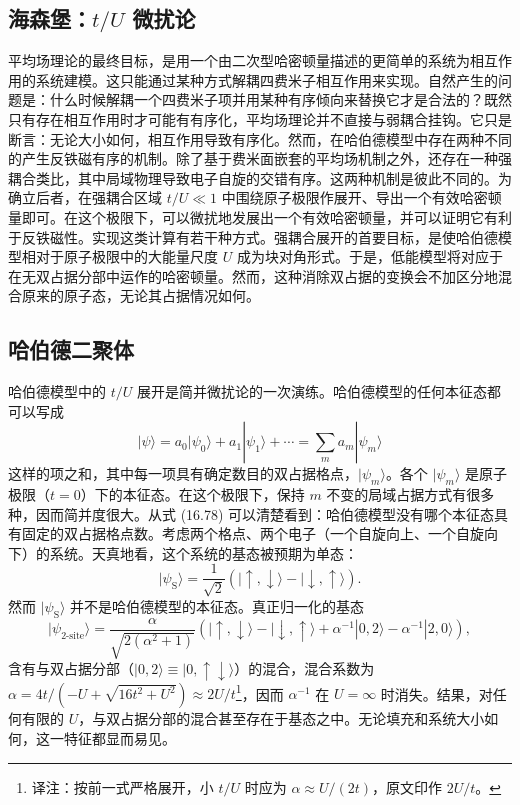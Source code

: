 \subsection{海森堡：$t/U$ 微扰论}

平均场理论的最终目标，是用一个由二次型哈密顿量描述的更简单的系统为相互作用的系统建模。这只能通过某种方式解耦四费米子相互作用来实现。自然产生的问题是：什么时候解耦一个四费米子项并用某种有序倾向来替换它才是合法的？既然只有存在相互作用时才可能有有序化，平均场理论并不直接与弱耦合挂钩。它只是断言：无论大小如何，相互作用导致有序化。然而，在哈伯德模型中存在两种不同的产生反铁磁有序的机制。除了基于费米面嵌套的平均场机制之外，还存在一种强耦合类比，其中局域物理导致电子自旋的交错有序。这两种机制是彼此不同的。为确立后者，在强耦合区域 $t/U\ll 1$ 中围绕原子极限作展开、导出一个有效哈密顿量即可。在这个极限下，可以微扰地发展出一个有效哈密顿量，并可以证明它有利于反铁磁性。实现这类计算有若干种方式。强耦合展开的首要目标，是使哈伯德模型相对于原子极限中的大能量尺度 $U$ 成为块对角形式。于是，低能模型将对应于在无双占据分部中运作的哈密顿量。然而，这种消除双占据的变换会不加区分地混合原来的原子态，无论其占据情况如何。

\subsection*{哈伯德二聚体}

哈伯德模型中的 $t/U$ 展开是简并微扰论的一次演练。哈伯德模型的任何本征态都可以写成
\begin{equation*}
|\psi\rangle=a_{0}|\psi_{0}\rangle+a_{1}|\psi_{1}\rangle+\cdots=\sum_{m}a_{m}|\psi_{m}\rangle\tag{16.78}
\end{equation*}
这样的项之和，其中每一项具有确定数目的双占据格点，$|\psi_{m}\rangle$。各个 $|\psi_{m}\rangle$ 是原子极限（$t=0$）下的本征态。在这个极限下，保持 $m$ 不变的局域占据方式有很多种，因而简并度很大。从式 (16.78) 可以清楚看到：哈伯德模型没有哪个本征态具有固定的双占据格点数。考虑两个格点、两个电子（一个自旋向上、一个自旋向下）的系统。天真地看，这个系统的基态被预期为单态：
\begin{equation*}
|\psi_{\mathrm{S}}\rangle=\frac{1}{\sqrt{2}}\left(|\uparrow,\downarrow\rangle-|\downarrow,\uparrow\rangle\right).\tag{16.79}
\end{equation*}
然而 $|\psi_{\mathrm{S}}\rangle$ 并不是哈伯德模型的本征态。真正归一化的基态
\begin{equation*}
|\psi_{2\text{-site}}\rangle=\frac{\alpha}{\sqrt{2(\alpha^{2}+1)}}\left(|\uparrow,\downarrow\rangle-|\downarrow,\uparrow\rangle+\alpha^{-1}|0,2\rangle-\alpha^{-1}|2,0\rangle\right),\tag{16.80}
\end{equation*}
含有与双占据分部（$|0,2\rangle\equiv|0,\uparrow\downarrow\rangle$）的混合，混合系数为 $\alpha=4t/(-U+\sqrt{16t^{2}+U^{2}})\approx 2U/t$\footnote{译注：按前一式严格展开，小 $t/U$ 时应为 $\alpha\approx U/(2t)$，原文印作 $2U/t$。}，因而 $\alpha^{-1}$ 在 $U=\infty$ 时消失。结果，对任何有限的 $U$，与双占据分部的混合甚至存在于基态之中。无论填充和系统大小如何，这一特征都显而易见。

